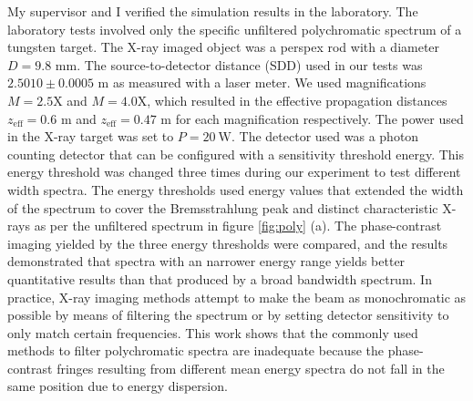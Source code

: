 \documentclass[10pt, a4paper, singlespacing]{report}
\begin{document}
My supervisor and I verified the simulation results in the laboratory. The laboratory tests involved only the specific unfiltered polychromatic spectrum of a tungsten target. The X-ray imaged object was a perspex rod with a diameter $D = 9.8$ mm. The source-to-detector distance (SDD) used in our tests was $2.5010 \pm 0.0005$ m as measured with a laser meter. We used magnifications $M = 2.5$X and $M = 4.0$X, which resulted in the effective propagation distances $z_{\mathrm{eff}} = 0.6$ m and $z_{\mathrm{eff}} = 0.47$ m for each magnification respectively. The power used in the X-ray target was set to $P = 20~\mathrm{W}$. The detector used was a photon counting detector that can be configured with a sensitivity threshold energy. This energy threshold was changed three times during our experiment to test different width spectra. The energy thresholds used energy values that extended the width of the spectrum to cover the Bremsstrahlung peak and distinct characteristic X-rays as per the unfiltered spectrum in figure \ref{fig:poly} (a).
The phase-contrast imaging yielded by the three energy thresholds were compared, and the results demonstrated that spectra with an narrower energy range yields better quantitative results than that produced by a broad bandwidth spectrum. 
In practice, X-ray imaging methods attempt to make the beam as monochromatic as possible by means of filtering the spectrum or by setting detector sensitivity to only match certain frequencies. This work shows that the commonly used methods to filter polychromatic spectra are inadequate because the phase-contrast fringes resulting from different mean energy spectra do not fall in the same position due to energy dispersion.

\end{document}
